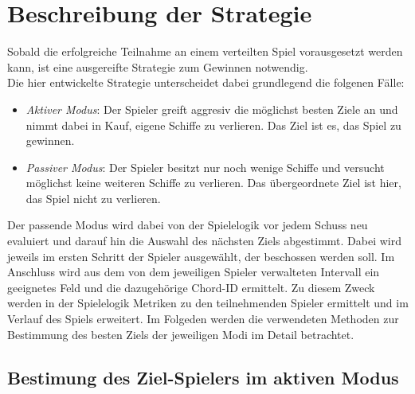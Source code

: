 
\section{Beschreibung der Strategie}

Sobald die erfolgreiche Teilnahme an einem verteilten Spiel vorausgesetzt werden kann, ist eine ausgereifte Strategie zum Gewinnen notwendig.\\ Die hier entwickelte Strategie unterscheidet dabei grundlegend die folgenen Fälle:

\begin{itemize}
\item \textit{Aktiver Modus}: Der Spieler greift aggresiv die möglichst besten Ziele an und nimmt dabei in Kauf, eigene Schiffe zu verlieren. Das Ziel ist es, das Spiel zu gewinnen.
\item \textit{Passiver Modus}: Der Spieler besitzt nur noch wenige Schiffe und versucht möglichst keine weiteren Schiffe zu verlieren. Das übergeordnete Ziel ist hier, das Spiel nicht zu verlieren.
\end{itemize}

Der passende Modus wird dabei von der Spielelogik vor jedem Schuss neu evaluiert und darauf hin die Auswahl des nächsten Ziels abgestimmt. Dabei wird jeweils im ersten Schritt der Spieler ausgewählt, der beschossen werden soll. Im Anschluss wird aus dem von dem jeweiligen Spieler verwalteten Intervall ein geeignetes Feld und die dazugehörige Chord-ID ermittelt. Zu diesem Zweck werden in der Spielelogik Metriken zu den teilnehmenden Spieler ermittelt und im Verlauf des Spiels erweitert. Im Folgeden werden die verwendeten Methoden zur Bestimmung des besten Ziels der jeweiligen Modi im Detail betrachtet.\\

\subsection{Bestimung des Ziel-Spielers im aktiven Modus}

